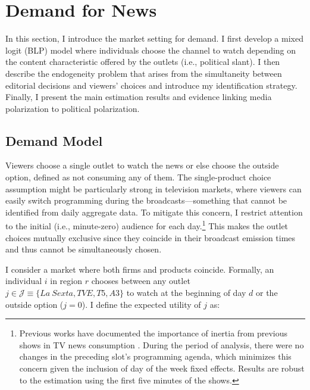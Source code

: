 \documentclass[12pt]{article}
\begin{document}
	
	
	
	
	
	
	
	

	
	
	\section{Demand for News}	\label{sec:demand}

In this section, I introduce the market setting for demand. I first develop a mixed logit (BLP) model \citep{berry_blp} where individuals choose the channel to watch depending on the content characteristic offered by the outlets (i.e., political slant). I then describe the endogeneity problem that arises from the simultaneity between editorial decisions and viewers' choices and introduce my identification strategy. Finally, I present the main estimation results and evidence linking media polarization to political polarization. 

	\subsection{Demand Model}



Viewers choose a single outlet to watch the news or else choose the outside option, defined as not consuming any of them. The single-product choice assumption might be particularly strong in television markets, where viewers can easily switch programming during the broadcasts—something that cannot be identified from daily aggregate data. To mitigate this concern, I restrict attention to the initial (i.e., minute-zero) audience for each day.\footnote{Previous works have documented the importance of inertia from previous shows in TV news consumption \citep{richter2025structural}. During the period of analysis, there were no changes in the preceding slot's programming agenda, which minimizes this concern given the inclusion of day of the week fixed effects. Results are robust to the estimation using the first five minutes of the shows. } This makes the outlet choices mutually exclusive since they coincide in their broadcast emission times and thus cannot be simultaneously chosen. 



	I consider a market where both firms and products coincide. Formally, an individual $ i $  in region $r$ chooses between any outlet $ j \in \mathcal{J}\equiv \{La \ Sexta,TVE,T5,A3\}$  to watch at the beginning of day $d$ or the outside option ($j=0$). I define the expected utility of  $j$ as:
	
\end{document}
